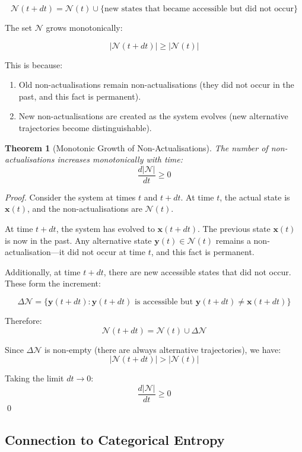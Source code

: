\documentclass[twocolumn,10pt]{article}
\newtheorem{theorem}{Theorem}[section]
\theoremstyle{definition}
\theoremstyle{remark}
\begin{document}
$$
\mathcal{N}(t + dt) = \mathcal{N}(t) \cup \{\text{new states that became accessible but did not occur}\}
$$

The set $\mathcal{N}$ grows monotonically:

$$
|\mathcal{N}(t + dt)| \geq |\mathcal{N}(t)|
$$

This is because:
\begin{enumerate}
\item Old non-actualisations remain non-actualisations (they did not occur in the past, and this fact is permanent).
\item New non-actualisations are created as the system evolves (new alternative trajectories become distinguishable).
\end{enumerate}

\begin{theorem}[Monotonic Growth of Non-Actualisations]
The number of non-actualisations increases monotonically with time:
$$
\frac{d|\mathcal{N}|}{dt} \geq 0
$$
\end{theorem}

\begin{proof}
Consider the system at times $t$ and $t + dt$. At time $t$, the actual state is $\mathbf{x}(t)$, and the non-actualisations are $\mathcal{N}(t)$.

At time $t + dt$, the system has evolved to $\mathbf{x}(t + dt)$. The previous state $\mathbf{x}(t)$ is now in the past. Any alternative state $\mathbf{y}(t) \in \mathcal{N}(t)$ remains a non-actualisation—it did not occur at time $t$, and this fact is permanent.

Additionally, at time $t + dt$, there are new accessible states that did not occur. These form the increment:

$$
\Delta \mathcal{N} = \{\mathbf{y}(t + dt) : \mathbf{y}(t + dt) \text{ is accessible but } \mathbf{y}(t + dt) \neq \mathbf{x}(t + dt)\}
$$

Therefore:
$$
\mathcal{N}(t + dt) = \mathcal{N}(t) \cup \Delta \mathcal{N}
$$

Since $\Delta \mathcal{N}$ is non-empty (there are always alternative trajectories), we have:
$$
|\mathcal{N}(t + dt)| > |\mathcal{N}(t)|
$$

Taking the limit $dt \to 0$:
$$
\frac{d|\mathcal{N}|}{dt} \geq 0
$$
\qed
\end{proof}

\subsection{Connection to Categorical Entropy}
\end{document}
